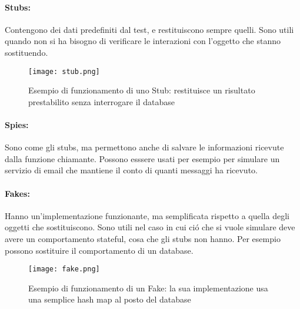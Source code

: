 \documentclass[italian, oneside]{sapthesis} %
\begin{document}
		\paragraph*{Stubs:}
		Contengono dei dati predefiniti dal test, e restituiscono sempre quelli. Sono utili quando non si ha bisogno di verificare le interazioni con l'oggetto che stanno sostituendo.
		\vspace*{0.2in}
		\begin{figure}[h]
			\begin{center}
			\texttt{[image: stub.png]}
			\captionsetup{justification=centering}
			\caption{Esempio di funzionamento di uno Stub: restituisce un risultato prestabilito senza interrogare il database}
			\label{fig:4}
		\end{center}
		\end{figure}

		\paragraph*{Spies:}
		Sono come gli stubs, ma permettono anche di salvare le informazioni ricevute dalla funzione chiamante. Possono esssere usati per esempio per simulare un servizio di email che mantiene il conto di quanti messaggi ha ricevuto.
		\pagebreak
		
		\paragraph*{Fakes:}
		Hanno un'implementazione funzionante, ma semplificata rispetto a quella degli oggetti che sostituiscono. Sono utili nel caso in cui ci\'o che si vuole simulare deve avere un comportamento stateful, cosa che gli stubs non hanno. Per esempio possono sostituire il comportamento di un database.
		\vspace*{0.2in}
		\begin{figure}[h]
			\begin{center}
			\texttt{[image: fake.png]}
			\captionsetup{justification=centering}
			\caption{Esempio di funzionamento di un Fake: la sua implementazione usa una semplice hash map al posto del database}
			\label{fig:6}
		\end{center}
		\end{figure}
\end{document}
